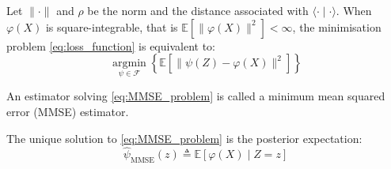 Let $\|\cdot\|$ and $\rho$ be the norm and the distance associated with $\langle\cdot\mid\cdot\rangle$. When $\varphi(X)$ is square-integrable, that is $\mathbb{E}\left[\|\varphi(X)\|^2\right]<\infty$, the minimisation problem \eqref{eq:loss_function} is equivalent to:
\begin{equation}
	\underset{\psi\in\mathcal{F}}{\operatorname{argmin}}\left\{\mathbb{E}\left[\|\psi(Z)-\varphi(X)\|^2\right]\right\}\label{eq:MMSE_problem}
\end{equation}

An estimator solving \eqref{eq:MMSE_problem} is called a minimum mean squared error (MMSE) estimator.

\begin{proposition}\label{th:MMSE_estimator}
	The unique solution to \eqref{eq:MMSE_problem} is the posterior expectation:
	\begin{equation}
		\hat{\psi}_{\mathrm{MMSE}}(z)\triangleq\mathbb{E}[\varphi(X)\mid Z=z]
	\end{equation}
\end{proposition}

